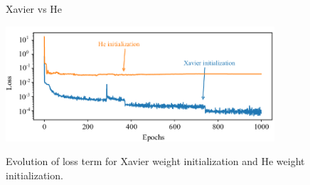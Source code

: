 \documentclass[serif, aspectratio=169]{beamer}
\begin{document}
        
    
\begin{frame}{Xavier vs He}
    \begin{center}
        \includegraphics[width=10cm]{pic/Evolution-of-loss-term-for-Xavier-weight-initialization-and-He-weight-initialization.png}  
    \end{center}
Evolution of loss term for Xavier weight initialization and He weight initialization.
\end{frame}
\end{document}
